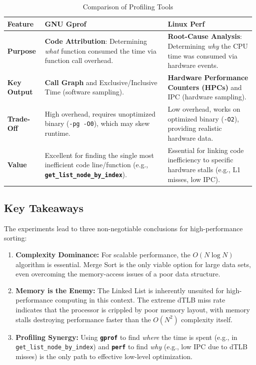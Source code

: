\documentclass[11pt, a4paper]{article}
\begin{document}
\begin{table}[h]
\centering
\caption{Comparison of Profiling Tools}
\label{tab:tool_comparison}
\begin{tabularx}{\textwidth}{l X X}
\toprule
\textbf{Feature} & \textbf{GNU Gprof} & \textbf{Linux Perf} \\
\midrule
\textbf{Purpose} & \textbf{Code Attribution}: Determining \textit{what} function consumed the time via function call overhead. & \textbf{Root-Cause Analysis}: Determining \textit{why} the CPU time was consumed via hardware events. \\
\textbf{Key Output} & \textbf{Call Graph} and Exclusive/Inclusive Time (software sampling). & \textbf{Hardware Performance Counters (HPCs)} and IPC (hardware sampling). \\
\textbf{Trade-Off} & High overhead, requires unoptimized binary (\texttt{-pg -O0}), which may skew runtime. & Low overhead, works on optimized binary (\texttt{-O2}), providing realistic hardware data. \\
\textbf{Value} & Excellent for finding the single most inefficient code line/function (e.g., \textbf{\texttt{get\_list\_node\_by\_index}}). & Essential for linking code inefficiency to specific hardware stalls (e.g., L1 misses, low IPC). \\
\bottomrule
\end{tabularx}
\end{table}

\subsection{Key Takeaways}
The experiments lead to three non-negotiable conclusions for high-performance sorting:
\begin{enumerate}
    \item \textbf{Complexity Dominance:} For scalable performance, the $O(N \log N)$ algorithm is essential. Merge Sort is the only viable option for large data sets, even overcoming the memory-access issues of a poor data structure.
    \item \textbf{Memory is the Enemy:} The Linked List is inherently unsuited for high-performance computing in this context. The extreme dTLB miss rate indicates that the processor is crippled by poor memory layout, with memory stalls destroying performance faster than the $O(N^2)$ complexity itself.
    \item \textbf{Profiling Synergy:} Using \textbf{\texttt{gprof}} to find \textit{where} the time is spent (e.g., in \texttt{get\_list\_node\_by\_index}) and \textbf{\texttt{perf}} to find \textit{why} (e.g., low IPC due to dTLB misses) is the only path to effective low-level optimization.
\end{enumerate}
\end{document}
